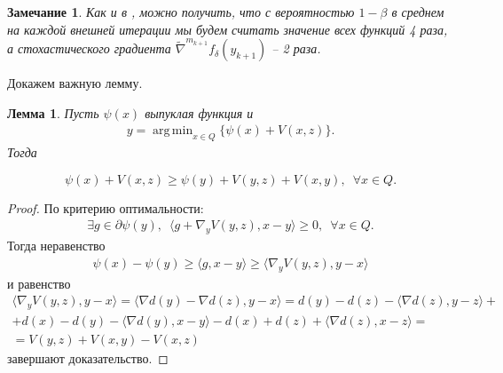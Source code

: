 \documentclass[11pt,a4]{article}
\newtheorem{lemma}{Лемма}
\newtheorem{remark}{Замечание}
\DeclareMathOperator*{\argmin}{arg\,min}
\begin{document}
\begin{remark}
Как и в \cite{gasnikov2018universal,nesterov2015universal}, можно получить, что с вероятностью $1 - \beta$ в среднем на каждой внешней итерации мы будем считать значение всех функций 4 раза, а стохастического градиента $\widetilde{\nabla}^{m_{k+1}} f_\delta(y_{k+1})$ -- 2 раза. 
\end{remark}

Докажем важную лемму.

\begin{lemma}
	Пусть $\psi(x)$ выпуклая функция и 
	\begin{gather*}
	y = {\argmin_{x \in Q}}\{\psi(x) + V(x,z)\}.
	\end{gather*}
	Тогда

	\begin{equation*}
	\psi(x) + V(x,z) \geq \psi(y) + V(y,z) + V(x,y) ,\,\,\, \forall x \in Q.
	\end{equation*}
	\label{lemma_maxmin_2}
\end{lemma}

\begin{proof}
	
	По критерию оптимальности:
	\begin{gather*}
		\exists g \in \partial\psi(y), \,\,\, \langle g + \nabla_y V(y, z), x - y  \rangle \geq 0 ,\,\,\, \forall x \in Q.
	\end{gather*}
	Тогда неравенство
	\begin{gather*}
		\psi(x) - \psi(y) \geq \langle g, x - y  \rangle \geq \langle \nabla_y V(y, z), y - x  \rangle
	\end{gather*}
и равенство
	\begin{gather*}
	\langle \nabla_y V(y, z), y - x  \rangle = \langle \nabla d(y) - \nabla d(z), y - x  \rangle = d(y) - d(z) - \langle \nabla d(z), y - z  \rangle +\\ + d(x) - d(y) - \langle \nabla d(y), x - y  \rangle - d(x) + d(z) + \langle \nabla d(z), x - z  \rangle = \\=
	V(y,z) + V(x,y) - V(x,z)
	\end{gather*}
завершают доказательство.
	
\end{proof}
\end{document}
